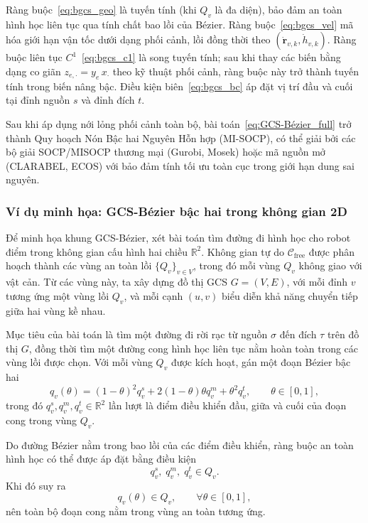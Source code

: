 Ràng buộc~\eqref{eq:bgcs_geo} là tuyến tính (khi $Q_v$ là đa diện), bảo đảm an
toàn hình học liên tục qua tính chất bao lồi của Bézier. Ràng
buộc~\eqref{eq:bgcs_vel} mã hóa giới hạn vận tốc dưới dạng phối cảnh, lồi đồng
thời theo $(\dot{\mathbf{r}}_{v,k}, \dot{h}_{v,k})$. Ràng buộc liên tục
$C^1$~\eqref{eq:bgcs_c1} là song tuyến tính; sau khi thay các biến bằng dạng co
giãn $z_{e,\cdot} = y_e\, x_\cdot$ theo kỹ thuật phối cảnh, ràng buộc này trở
thành tuyến tính trong biến nâng bậc. Điều kiện biên~\eqref{eq:bgcs_bc} áp đặt
vị trí đầu và cuối tại đỉnh nguồn $s$ và đỉnh đích $t$.

Sau khi áp dụng nới lỏng phối cảnh toàn bộ, bài toán~\eqref{eq:GCS-Bézier_full}
trở thành Quy hoạch Nón Bậc hai Nguyên Hỗn hợp (MI-SOCP), có thể giải bởi các
bộ giải SOCP/MISOCP thương mại (Gurobi, Mosek) hoặc mã nguồn mở (CLARABEL,
ECOS) với bảo đảm tính tối ưu toàn cục trong giới hạn dung sai nguyên.

\subsubsection{Ví dụ minh họa: GCS-Bézier bậc hai trong không gian 2D}
\label{subsubsec:GCS-Bézier_example2d}

Để minh họa khung GCS-Bézier, xét bài toán tìm đường đi hình học cho robot điểm
trong không gian cấu hình hai chiều $\mathbb{R}^2$. Không gian tự do
$\mathcal{C}_{\mathrm{free}}$ được phân hoạch thành các vùng an toàn lồi
$\{Q_v\}_{v\in V}$, trong đó mỗi vùng $Q_v$ không giao với vật cản. Từ các vùng
này, ta xây dựng đồ thị GCS $G=(V,E)$, với mỗi đỉnh $v$ tương ứng một vùng lồi
$Q_v$, và mỗi cạnh $(u,v)$ biểu diễn khả năng chuyển tiếp giữa hai vùng kề nhau.

Mục tiêu của bài toán là tìm một đường đi rời rạc từ nguồn $\sigma$ đến đích
$\tau$ trên đồ thị $G$, đồng thời tìm một đường cong hình học liên tục nằm hoàn
toàn trong các vùng lồi được chọn. Với mỗi vùng $Q_v$ được kích hoạt, gán một
đoạn Bézier bậc hai
\begin{equation}
    q_v(\theta)
    =
    (1-\theta)^2 q_v^s
    + 2(1-\theta)\theta q_v^m
    + \theta^2 q_v^t,
    \qquad \theta\in[0,1],
\end{equation}
trong đó $q_v^s,q_v^m,q_v^t\in\mathbb{R}^2$ lần lượt là điểm điều khiển đầu,
giữa và cuối của đoạn cong trong vùng $Q_v$.

Do đường Bézier nằm trong bao lồi của các điểm điều khiển, ràng buộc an toàn
hình học có thể được áp đặt bằng điều kiện
\begin{equation}
    q_v^s,\;q_v^m,\;q_v^t \in Q_v.
\end{equation}
Khi đó suy ra
\begin{equation}
    q_v(\theta)\in Q_v,\qquad \forall \theta\in[0,1],
\end{equation}
nên toàn bộ đoạn cong nằm trong vùng an toàn tương ứng.

